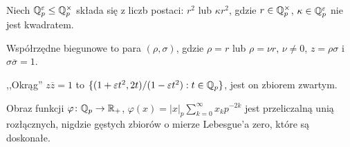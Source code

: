 Niech $\mathbb Q_p^\varepsilon \le \mathbb Q_p^\times$ składa się z liczb postaci: $r^2$ lub $\kappa r^2$, gdzie $r \in \mathbb Q_p^\times$, $\kappa \in \mathbb Q_p^\varepsilon$ nie jest kwadratem.

\begin{definicja}
	Współrzędne  biegunowe to para $(\rho, \sigma)$, gdzie $\rho = r$ lub $\rho = \nu r$, $\nu \neq 0$, $z = \rho \sigma$ i $\sigma \overline \sigma = 1$.
\end{definicja}

,,Okrąg'' $z \overline z = 1$ to $\{(1 + \varepsilon t^2, 2t) / (1 - \varepsilon t^2) : t \in \mathbb Q_p\}$, jest on zbiorem zwartym.

\begin{fakt}
	Obraz  funkcji $\varphi \colon \mathbb Q_p \to \mathbb R_+$, $\varphi(x) = |x|_p \sum_{k = 0}^\infty x_k p^{-2k}$ jest przeliczalną unią rozłącznych, nigdzie gęstych zbiorów o mierze Lebesgue'a zero, które są doskonałe.
\end{fakt}
